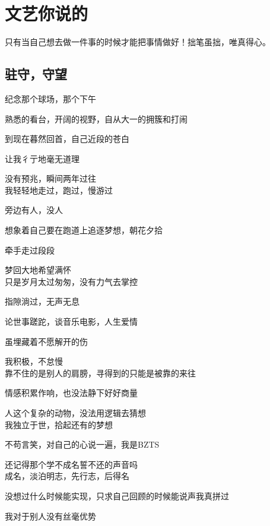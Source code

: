 \documentclass[color=green,mathpazo,titlestyle=hang]{elegantbook}
\author{周涛}
\begin{document}
\maketitle
\tableofcontents
\mainmatter
\chapter{文艺你说的}

只有当自己想去做一件事的时候才能把事情做好！拙笔虽拙，唯真得心。

\section{驻守，守望}
纪念那个球场，那个下午

熟悉的看台，开阔的视野，自从大一的拥簇和打闹

到现在暮然回首，自己近段的苍白

让我彳亍地毫无道理

没有预兆，瞬间两年过往~\\

我轻轻地走过，跑过，慢游过

旁边有人，没人

想象着自己要在跑道上追逐梦想，朝花夕拾

牵手走过段段

梦回大地希望满怀~\\
 
只是岁月太过匆匆，没有力气去掌控

指隙淌过，无声无息

论世事蹉跎，谈音乐电影，人生爱情

虽埋藏着不愿解开的伤

我积极，不怠慢~\\
 
靠不住的是别人的肩膀，寻得到的只能是被靠的来往

情感积累作响，也没法静下好好商量

人这个复杂的动物，没法用逻辑去猜想~\\
 
我独立于世，拾起还有的梦想

不苟言笑，对自己的心说一遍，我是BZTS

还记得那个学不成名誓不还的声音吗~\\
 
成名，淡泊明志，先行志，后得名

没想过什么时候能实现，只求自己回顾的时候能说声我真拼过

我对于别人没有丝毫优势
\end{document}
